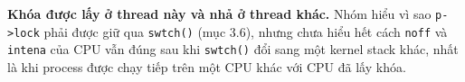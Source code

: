 \item \textbf{Khóa được lấy ở thread này và nhả ở thread khác.} Nhóm hiểu vì sao \texttt{p->lock} phải được giữ qua \texttt{swtch()} (mục 3.6), nhưng chưa hiểu hết cách \texttt{noff} và \texttt{intena} của CPU vẫn đúng sau khi \texttt{swtch()} đổi sang một kernel stack khác, nhất là khi process được chạy tiếp trên một CPU khác với CPU đã lấy khóa.
